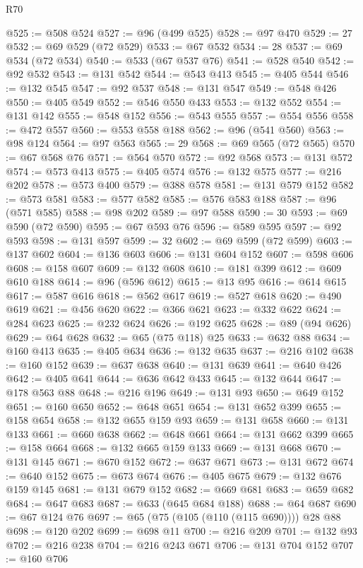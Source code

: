\begin{lexlean}{R70}
\begin{coremodule}
@525 := @508 @524
@527 := @96 (@499 @525)
@528 := @97 @470
@529 := 27
@532 := @69 @529 (@72 @529)
@533 := @67 @532
@534 := 28
@537 := @69 @534 (@72 @534)
@540 := @533 (@67 @537 @76)
@541 := @528 @540
@542 := @92 @532
@543 := @131 @542
@544 := @543 @413
@545 := @405 @544
@546 := @132 @545
@547 := @92 @537
@548 := @131 @547
@549 := @548 @426
@550 := @405 @549
@552 := @546 @550 @433
@553 := @132 @552
@554 := @131 @142
@555 := @548 @152
@556 := @543 @555
@557 := @554 @556
@558 := @472 @557
@560 := @553 @558 @188
@562 := @96 (@541 @560)
@563 := @98 @124
@564 := @97 @563
@565 := 29
@568 := @69 @565 (@72 @565)
@570 := @67 @568 @76
@571 := @564 @570
@572 := @92 @568
@573 := @131 @572
@574 := @573 @413
@575 := @405 @574
@576 := @132 @575
@577 := @216 @202
@578 := @573 @400
@579 := @388 @578
@581 := @131 @579 @152
@582 := @573 @581
@583 := @577 @582
@585 := @576 @583 @188
@587 := @96 (@571 @585)
@588 := @98 @202
@589 := @97 @588
@590 := 30
@593 := @69 @590 (@72 @590)
@595 := @67 @593 @76
@596 := @589 @595
@597 := @92 @593
@598 := @131 @597
@599 := 32
@602 := @69 @599 (@72 @599)
@603 := @137 @602
@604 := @136 @603
@606 := @131 @604 @152
@607 := @598 @606
@608 := @158 @607
@609 := @132 @608
@610 := @181 @399
@612 := @609 @610 @188
@614 := @96 (@596 @612)
@615 := @13 @95
@616 := @614 @615
@617 := @587 @616
@618 := @562 @617
@619 := @527 @618
@620 := @490 @619
@621 := @456 @620
@622 := @366 @621
@623 := @332 @622
@624 := @284 @623
@625 := @232 @624
@626 := @192 @625
@628 := @89 (@94 @626)
@629 := @64 @628
@632 := @65 (@75 @118) @25
@633 := @632 @88
@634 := @160 @413
@635 := @405 @634
@636 := @132 @635
@637 := @216 @102
@638 := @160 @152
@639 := @637 @638
@640 := @131 @639
@641 := @640 @426
@642 := @405 @641
@644 := @636 @642 @433
@645 := @132 @644
@647 := @178 @563 @88
@648 := @216 @196
@649 := @131 @93
@650 := @649 @152
@651 := @160 @650
@652 := @648 @651
@654 := @131 @652 @399
@655 := @158 @654
@658 := @132 @655 @159 @93
@659 := @131 @658
@660 := @131 @133
@661 := @660 @638
@662 := @648 @661
@664 := @131 @662 @399
@665 := @158 @664
@668 := @132 @665 @159 @133
@669 := @131 @668
@670 := @131 @145
@671 := @670 @152
@672 := @637 @671
@673 := @131 @672
@674 := @640 @152
@675 := @673 @674
@676 := @405 @675
@679 := @132 @676 @159 @145
@681 := @131 @679 @152
@682 := @669 @681
@683 := @659 @682
@684 := @647 @683
@687 := @633 (@645 @684 @188)
@688 := @64 @687
@690 := @67 @124 @76
@697 := @65 (@75 (@105 (@110 (@115 @690)))) @28 @88
@698 := @120 @202
@699 := @698 @11
@700 := @216 @209
@701 := @132 @93
@702 := @216 @238
@704 := @216 @243 @671
@706 := @131 @704 @152
@707 := @160 @706

\end{coremodule}
\end{lexlean}

